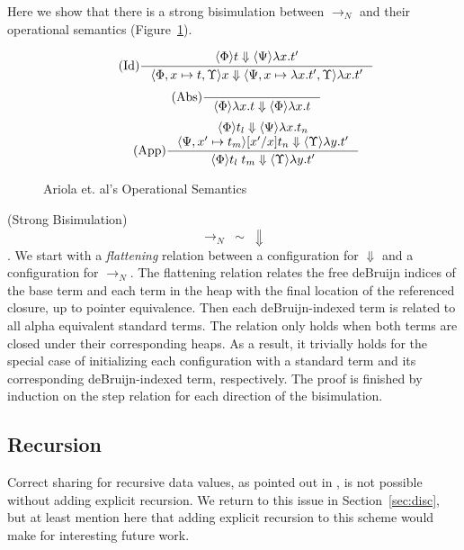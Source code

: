 Here we show that there is a strong bisimulation between
$\rightarrow_{N}$ and their operational semantics (Figure~\ref{fig:cbn}). 

\begin{figure}
\begin{align*}
\tag{Id} \inference
{\langle \Phi \rangle t \Downarrow \langle \Psi \rangle \lambda x.t'}
{\langle \Phi, x \mapsto t, \Upsilon \rangle x \Downarrow \langle \Psi, x
\mapsto \lambda x.t', \Upsilon \rangle \lambda x.t'}
\end{align*}
\begin{align*}
\tag{Abs} \inference 
{}
{\langle \Phi \rangle \lambda x . t \Downarrow \langle \Phi \rangle \lambda x.t}
\end{align*}
\begin{align*}
\tag{App} \inference
{\langle \Phi \rangle t_l \Downarrow \langle \Psi \rangle \lambda 
x.t_n \\ \langle \Psi, x' \mapsto t_m \rangle [x'/x]t_n \Downarrow \langle
\Upsilon \rangle \lambda y.t'}
{\langle \Phi \rangle t_l \; t_m \Downarrow \langle \Upsilon \rangle \lambda y.t'}
\end{align*}
\caption{Ariola et. al's Operational Semantics}
\label{fig:cbn}
\end{figure}

{\theorem \textnormal{(Strong Bisimulation)} $$\xrightarrow{}_{N} \; \sim \;
\Downarrow$$.}
We start with a \emph{flattening} relation between a configuration for
$\Downarrow$ and a configuration for $\xrightarrow{}_{N}$. The flattening
relation relates the free deBruijn indices of the base term and each term in
the heap with the final location of the referenced closure, up to pointer
equivalence. Then each deBruijn-indexed term is related to all alpha equivalent
standard terms. The relation only holds when both terms are closed under their
corresponding heaps. As a result, it trivially holds for the special case of
initializing each configuration with a standard term and its corresponding
deBruijn-indexed term, respectively. The proof is finished by induction on the
step relation for each direction of the bisimulation.

\subsection{Recursion}

Correct sharing for recursive data values, as pointed out in
\cite{ariola1995call}, is not possible without adding explicit recursion. We
return to this issue in Section~\ref{sec:disc}, but at least mention here that
adding explicit recursion to this scheme would make for interesting future work.
